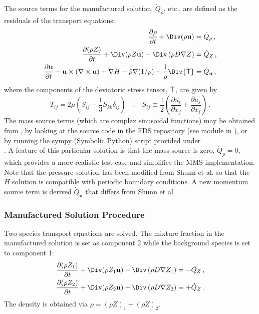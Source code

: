 \documentclass[11pt]{book}
\begin{document}
The source terms for the manufactured solution, $\dot{Q}_\rho$, etc., are defined as the residuals of the transport equations:
\begin{align}
\label{eqn_mms_continuity} \frac{\partial \rho}{\partial t} + \Div(\rho \mathbf{u}) &= \dot{Q}_\rho \,\mbox{,}\\
\frac{\partial (\rho Z)}{\partial t} + \Div(\rho Z \mathbf{u}) - \Div\left(\rho D \nabla Z\right) &= \dot{Q}_Z \,\mbox{,}\\
\frac{\partial \mathbf{u}}{\partial t} - \mathbf{u} \times (\nabla \times \mathbf{u}) + \nabla H - \tilde{p} \nabla(1/\rho) - \frac{1}{\rho}\Div{\sf T} &= \dot{Q}_{\mathbf{u}} \,\mbox{,}
\end{align}
where the components of the deviatoric stress tensor, ${\sf T}$, are given by
\begin{equation}
T_{ij} = 2\mu \left( S_{ij} -  \frac{1}{3} S_{kk} \delta_{ij} \right) \quad\mbox{;}\quad S_{ij} \equiv \frac{1}{2}\left( \frac{\partial u_i}{\partial x_j} + \frac{\partial u_j}{\partial x_i} \right) \,\mbox{.}
\end{equation}
The mass source terms (which are complex sinusoidal functions) may be obtained from \cite{Shunn:2012}, by looking at the source code in the FDS repository \cite{FDS-SMV_repository} (see module  in ), or by running the sympy (Symbolic Python) script provided under\\
.  A feature of this particular solution is that the mass source is zero, $\dot{Q}_\rho = 0$, which provides a more realistic test case and simplifies the MMS implementation.  Note that the pressure solution has been modified from Shunn et al. \cite{Shunn:2012} so that the $H$ solution is compatible with periodic boundary conditions.  A new momentum source term is derived $\dot{Q}_{\mathbf{u}}$ that differs from Shunn et al.

\subsubsection*{Manufactured Solution Procedure}

Two species transport equations are solved.  The mixture fraction in the manufactured solution is set as component 2 while the background species is set to component 1:
\begin{align}
\label{eqn_fds_species_1} \frac{\partial (\rho Z_1)}{\partial t} + \Div(\rho Z_1 \mathbf{u}) - \Div\left(\rho D \nabla Z_1\right) &= - \dot{Q}_Z \,\mbox{,}\\
\label{eqn_fds_species_2} \frac{\partial (\rho Z_2)}{\partial t} + \Div(\rho Z_2 \mathbf{u}) - \Div\left(\rho D \nabla Z_2\right) &= + \dot{Q}_Z \,\mbox{.}
\end{align}
The density is obtained via $\rho = (\rho Z)_1 + (\rho Z)_2$.
\end{document}
